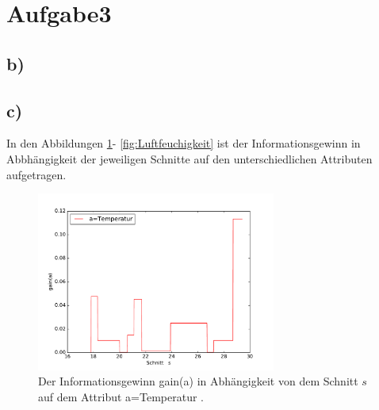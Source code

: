 \newpage
\section{Aufgabe3}
\label{sec:a3}

%


\subsection{b)}
\label{subsec:a3b}



\subsection{c)}
\label{subsec:a3c}

In den Abbildungen \ref{fig:Temperatur}- \ref{fig:Luftfeuchigkeit}
ist der Informationsgewinn
in Abbhängigkeit der jeweiligen Schnitte auf den
unterschiedlichen Attributen aufgetragen.


\begin{figure}
  \centering
  \includegraphics[width=0.7\textwidth]{Temperatur.pdf}
  \caption{ Der Informationsgewinn gain(a) in Abhängigkeit von dem Schnitt $s$ auf dem Attribut a=Temperatur .}
  \label{fig:Temperatur}
\end{figure}


